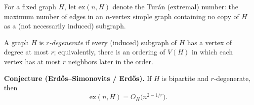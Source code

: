 For a fixed graph $H$, let $\mathrm{ex}(n,H)$ denote the Tur\'an (extremal) number: the maximum number of edges in an $n$-vertex simple graph containing no copy of $H$ as a (not necessarily induced) subgraph.

A graph $H$ is \emph{$r$-degenerate} if every (induced) subgraph of $H$ has a vertex of degree at most $r$; equivalently, there is an ordering of $V(H)$ in which each vertex has at most $r$ neighbors later in the order.

\textbf{Conjecture (Erd\H{o}s--Simonovits / Erd\H{o}s).}
If $H$ is bipartite and $r$-degenerate, then
\[
\mathrm{ex}(n,H)=O_H\bigl(n^{2-1/r}\bigr).
\]
